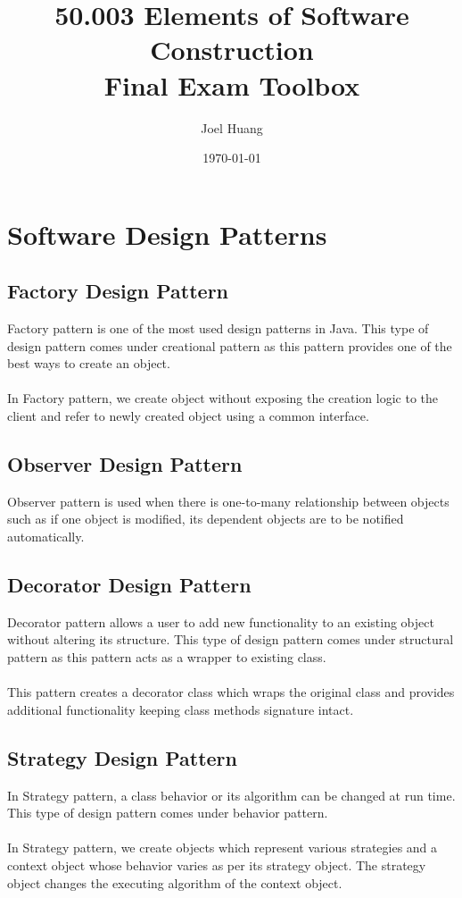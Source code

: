 \documentclass{article}
\title{50.003 Elements of Software Construction\\Final Exam Toolbox}
\author{Joel Huang}
\date{\today}
\begin{document}
\maketitle

\section{Software Design Patterns}
\subsection{Factory Design Pattern}
Factory pattern is one of the most used design patterns in Java. This type of design pattern comes under creational pattern as this pattern provides one of the best ways to create an object.\\\\
In Factory pattern, we create object without exposing the creation logic to the client and refer to newly created object using a common interface.

\break

\subsection{Observer Design Pattern}
Observer pattern is used when there is one-to-many relationship between objects such as if one object is modified, its dependent objects are to be notified automatically.

\break

\subsection{Decorator Design Pattern}
Decorator pattern allows a user to add new functionality to an existing object without altering its structure. This type of design pattern comes under structural pattern as this pattern acts as a wrapper to existing class.\\\\
This pattern creates a decorator class which wraps the original class and provides additional functionality keeping class methods signature intact.

\break

\subsection{Strategy Design Pattern}
In Strategy pattern, a class behavior or its algorithm can be changed at run time. This type of design pattern comes under behavior pattern.\\\\
In Strategy pattern, we create objects which represent various strategies and a context object whose behavior varies as per its strategy object. The strategy object changes the executing algorithm of the context object.\\

\break
\end{document}
